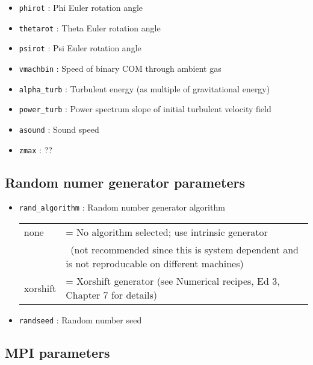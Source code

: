 \documentclass[a4paper]{article}
\newcommand{\var}[1]{\texttt{#1}}
\begin{document}
\begin{itemize}
\item \var{phirot}       : Phi Euler rotation angle
\item \var{thetarot}     : Theta Euler rotation angle
\item \var{psirot}       : Psi Euler rotation angle
\item \var{vmachbin}     : Speed of binary COM through ambient gas

\item \var{alpha\_turb}  : Turbulent energy (as multiple of gravitational energy)
\item \var{power\_turb}  : Power spectrum slope of initial turbulent velocity field

\item \var{asound}       : Sound speed
\item \var{zmax}         : ??

\end{itemize}


\subsection{Random numer generator parameters}

\begin{itemize}

\item \var{rand\_algorithm} : Random number generator algorithm \\
\begin{tabular}{ll}
none     & = No algorithm selected; use intrinsic generator \\
         & \,\,\,(not recommended since this is system dependent and is not reproducable on different machines) \\
xorshift & = Xorshift generator (see Numerical recipes, Ed 3, Chapter 7 for details)
\end{tabular}

\item \var{randseed}        : Random number seed

\end{itemize}





\subsection{MPI parameters}
\end{document}
